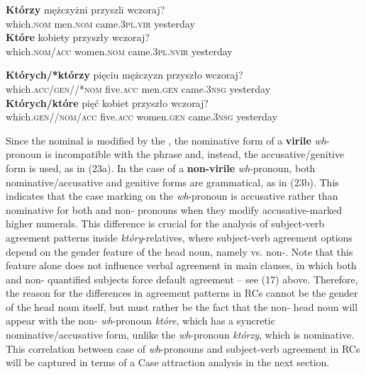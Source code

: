 \documentclass[output=paper]{langsci/langscibook}
\begin{document}
\ea%
    \label{ex:leska:22}
    \ea
    \gll \textbf{Którzy}   mężczyżni   przyszli   wczoraj?\\
        which.\textsc{nom}   men.\textsc{nom}  came.\textsc{3pl.vir} yesterday\\
    \ex
    \gll \textbf{Które}   kobiety   przyszły     wczoraj?\\
         which.\textsc{nom/acc} women.\textsc{nom}   came.\textsc{3pl.nvir} yesterday\\
    \z
\z    


\ea%
    \label{ex:leska:23}
    \ea
    \gll \textbf{Których/*którzy}   pięciu   mężczyzn   przyszło    wczoraj?\\
         which.\textsc{acc/gen//*nom} five.\textsc{acc} men.\textsc{gen}  came.\textsc{3nsg} yesterday\\
    \ex
    \gll \textbf{Których/które}  pięć     kobiet   przyszło     wczoraj?\\
         which.\textsc{gen//nom/acc} five.\textsc{acc} women.\textsc{gen}   came.\textsc{3nsg} yesterday\\
    \z
\z

Since the nominal is modified by the , the nominative form of a \textbf{virile} \textit{wh}{}-pronoun is incompatible with the  phrase and, instead, the accusative\slash genitive form is used, as in (23a). In the case of a \textbf{non-virile} \textit{wh}{}-pronoun, both nominative\slash accusative and genitive forms are grammatical, as in (23b). This indicates that the case marking on the \textit{wh}{}-pronoun is accusative rather than nominative for both  and non- pronouns when they modify accusative-marked higher numerals. This difference is crucial for the analysis of subject-verb agreement patterns inside \textit{który}{}-relatives, where subject-verb agreement options depend on the gender feature of the head noun, namely  vs. non-. Note that this feature alone does not influence verbal agreement in main clauses, in which both  and non- quantified subjects force default agreement – see (17) above. Therefore, the reason for the differences in agreement patterns in RCs cannot be the gender of the head noun itself, but must rather be the fact that the non- head noun will appear with the non- \textit{wh}{}-pronoun \textit{które}, which has a syncretic nominative/accusative form, unlike the  \textit{wh}{}-pronoun \textit{którzy}, which is nominative. This correlation between case  of \textit{wh}{}-pronouns and subject-verb agreement in RCs will be captured in terms of a Case attraction analysis in the next section.
\end{document}
